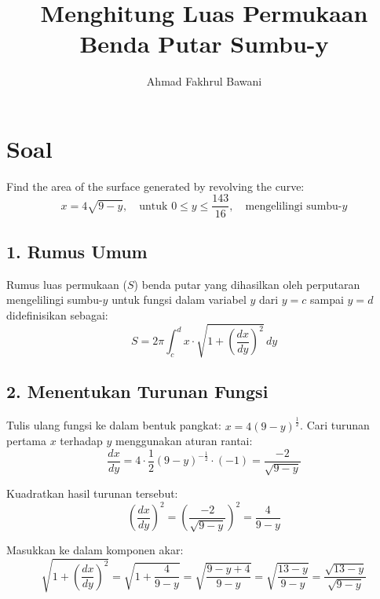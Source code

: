 \documentclass[12pt,a4paper]{article}
\title{Menghitung Luas Permukaan Benda Putar Sumbu-y}
\author{Ahmad Fakhrul Bawani}
\date{}
\begin{document}
\maketitle

\section*{Soal}

Find the area of the surface generated by revolving the curve:
\begin{equation*}
  x = 4\sqrt{9-y}, \quad \text{untuk } 0 \le y \le \frac{143}{16}, \quad \text{mengelilingi sumbu-}y
\end{equation*}

\subsection*{1. Rumus Umum}
Rumus luas permukaan ($S$) benda putar yang dihasilkan oleh perputaran mengelilingi sumbu-$y$ untuk fungsi dalam variabel $y$ dari $y = c$ sampai $y = d$ didefinisikan sebagai:
\begin{equation*}
  S = 2\pi \int_{c}^{d} x \cdot \sqrt{1 + \left(\frac{dx}{dy}\right)^2} \, dy
\end{equation*}

\subsection*{2. Menentukan Turunan Fungsi}
Tulis ulang fungsi ke dalam bentuk pangkat: $x = 4(9-y)^{\frac{1}{2}}$. Cari turunan pertama $x$ terhadap $y$ menggunakan aturan rantai:
\begin{equation*}
  \frac{dx}{dy} = 4 \cdot \frac{1}{2}(9-y)^{-\frac{1}{2}} \cdot (-1) = \frac{-2}{\sqrt{9-y}}
\end{equation*}

Kuadratkan hasil turunan tersebut:
\begin{equation*}
  \left(\frac{dx}{dy}\right)^2 = \left(\frac{-2}{\sqrt{9-y}}\right)^2 = \frac{4}{9-y}
\end{equation*}

Masukkan ke dalam komponen akar:
\begin{equation*}
  \sqrt{1 + \left(\frac{dx}{dy}\right)^2} = \sqrt{1 + \frac{4}{9-y}} = \sqrt{\frac{9-y+4}{9-y}} = \sqrt{\frac{13-y}{9-y}} = \frac{\sqrt{13-y}}{\sqrt{9-y}}
\end{equation*}
\end{document}
